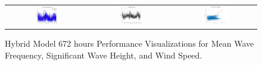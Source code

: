 \begin{figure}[ht!]
\begin{tabular}{ccc}
    \includegraphics[width=0.32\textwidth]{graphs/hybrid/672 hours/wind_speed/actual vs forecast.jpg} &
    \includegraphics[width=0.32\textwidth]{graphs/hybrid/672 hours/wind_speed/residuals.jpg} &
    \includegraphics[width=0.32\textwidth]{graphs/hybrid/672 hours/wind_speed/scatter plot.jpg} \\
  \end{tabular}
  \caption{Hybrid Model 672 hours Performance Visualizations for Mean Wave Frequency, Significant Wave Height, and Wind Speed.}
  \label{fig:hybrid_672_hours}
\end{figure}